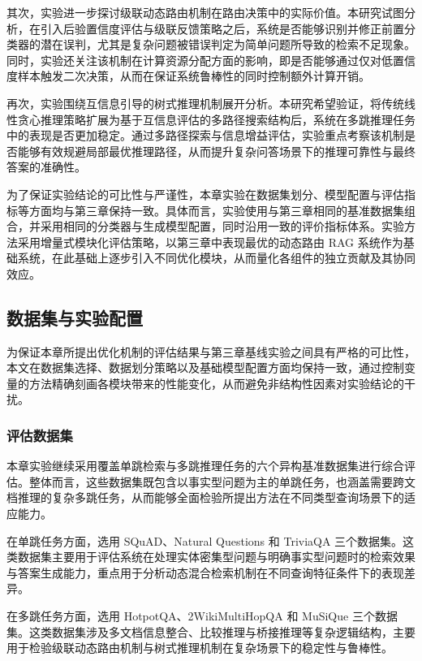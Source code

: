 其次，实验进一步探讨级联动态路由机制在路由决策中的实际价值。本研究试图分析，在引入后验置信度评估与级联反馈策略之后，系统是否能够识别并修正前置分类器的潜在误判，尤其是复杂问题被错误判定为简单问题所导致的检索不足现象。同时，实验还关注该机制在计算资源分配方面的影响，即是否能够通过仅对低置信度样本触发二次决策，从而在保证系统鲁棒性的同时控制额外计算开销。

再次，实验围绕互信息引导的树式推理机制展开分析。本研究希望验证，将传统线性贪心推理策略扩展为基于互信息评估的多路径搜索结构后，系统在多跳推理任务中的表现是否更加稳定。通过多路径探索与信息增益评估，实验重点考察该机制是否能够有效规避局部最优推理路径，从而提升复杂问答场景下的推理可靠性与最终答案的准确性。

为了保证实验结论的可比性与严谨性，本章实验在数据集划分、模型配置与评估指标等方面均与第三章保持一致。具体而言，实验使用与第三章相同的基准数据集组合，并采用相同的分类器与生成模型配置，同时沿用一致的评价指标体系。实验方法采用增量式模块化评估策略，以第三章中表现最优的动态路由 RAG 系统作为基础系统，在此基础上逐步引入不同优化模块，从而量化各组件的独立贡献及其协同效应。

\subsection{数据集与实验配置}

为保证本章所提出优化机制的评估结果与第三章基线实验之间具有严格的可比性，本文在数据集选择、数据划分策略以及基础模型配置方面均保持一致，通过控制变量的方法精确刻画各模块带来的性能变化，从而避免非结构性因素对实验结论的干扰。

\subsubsection{评估数据集}

本章实验继续采用覆盖单跳检索与多跳推理任务的六个异构基准数据集进行综合评估。整体而言，这些数据集既包含以事实型问题为主的单跳任务，也涵盖需要跨文档推理的复杂多跳任务，从而能够全面检验所提出方法在不同类型查询场景下的适应能力。

在单跳任务方面，选用 SQuAD、Natural Questions 和 TriviaQA 三个数据集。这类数据集主要用于评估系统在处理实体密集型问题与明确事实型问题时的检索效果与答案生成能力，重点用于分析动态混合检索机制在不同查询特征条件下的表现差异。

在多跳任务方面，选用 HotpotQA、2WikiMultiHopQA 和 MuSiQue 三个数据集。这类数据集涉及多文档信息整合、比较推理与桥接推理等复杂逻辑结构，主要用于检验级联动态路由机制与树式推理机制在复杂场景下的稳定性与鲁棒性。


